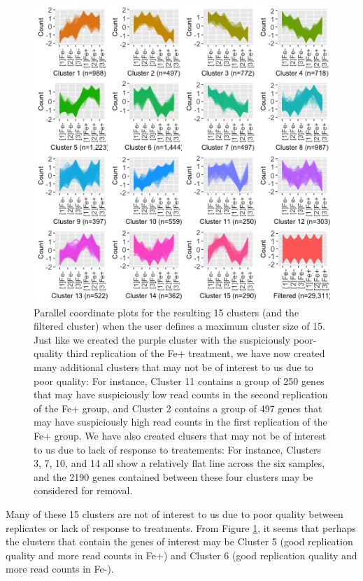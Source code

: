 \documentclass[11pt,a4paper,oldfontcommands,openany]{memoir}
\numberwithin{equation}{section} %
\begin{document}
\begin{figure}[H]
  \begin{framed}
  \centering
  \includegraphics[width=\textwidth]{L120_15}
  \end{framed}
  \caption{Parallel coordinate plots for the resulting 15 clusters (and the filtered cluster) when the user defines a maximum cluster size of 15. Just like we created the purple cluster with the suspiciously poor-quality third replication of the Fe+ treatment, we have now created many additional clusters that may not be of interest to us due to poor quality: For instance, Cluster 11 contains a group of 250 genes that may have suspiciously low read counts in the second replication of the Fe+ group, and Cluster 2 contains a group of 497 genes that may have suspiciously high read counts in the first replication of the Fe+ group. We have also created clusers that may not be of interest to us due to lack of response to treatements: For instance, Clusters 3, 7, 10, and 14 all show a relatively flat line across the six samples, and the 2190 genes contained between these four clusters may be considered for removal.}
  \label{fig:L120_15}
\end{figure}

Many of these 15 clusters are not of interest to us due to poor quality between replicates or lack of response to treatments. From Figure \ref{fig:L120_15}, it seems that perhaps the clusters that contain the genes of interest may be Cluster 5 (good replication quality and more read counts in Fe+) and Cluster 6 (good replication quality and more read counts in Fe-).
\end{document}
